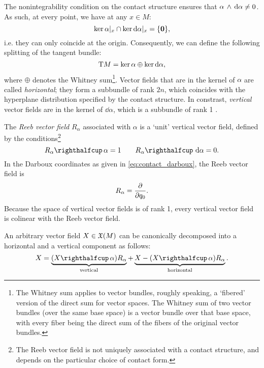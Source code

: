 The nonintegrability condition on the contact structure ensures that \( \alpha\,\wedge\,\dd{\alpha}  \neq 0\). As such, at every point, we have at any \(x\in M\):
\begin{equation}
     \ker{\alpha}\vert_x \cap \ker{\dd{\alpha}}\vert_x = \qty{\mathbf{0}},
\end{equation}
i.e. they can only coincide at the origin. Consequently, we can define the following splitting of the tangent bundle:
\begin{equation}
     \mathrm{T}M = \ker{\alpha}\oplus\ker{\dd{\alpha}},
\end{equation}
where \(\oplus\) denotes the Whitney sum\footnote{The Whitney sum applies to vector bundles, roughly speaking, a `fibered' version of the direct sum for vector spaces. The Whitney sum of two vector bundles (over the same base space) is a vector bundle over that base space, with every fiber being the direct sum of the fibers of the original vector bundles.}. Vector fields that are in the kernel of \(\alpha\) are called \emph{horizontal}; they form a subbundle of rank \(2n\), which coincides with the hyperplane distribution specified by the contact structure. In constrast, \emph{vertical} vector fields are in the kernel of \(\dd{\alpha}\), which is a subbundle of rank 1 \cite{Libermann1987}.

The \emph{Reeb vector field} \(R_\alpha\) associated with \(\alpha\) is a `unit' vertical vector field, defined by the conditions\footnote{The Reeb vector field is not uniquely associated with a contact structure, and depends on the particular choice of contact form.}
    \begin{equation}
     \intpr{R_\alpha}{\alpha} = 1 \qquad \intpr{R_\alpha}{\dd{\alpha}} = 0.
\end{equation}
In the Darboux coordinates as given in \cref{eq:contact_darboux}, the Reeb vector field is
    \begin{equation}
     R_\alpha = \pdv{}{q_0}.
\end{equation} 
Because the space of vertical vector fields is of rank 1, every vertical vector field is colinear with the Reeb vector field.

An arbitrary vector field \(X \in \mathfrak{X}\qty(M)\) can be canonically decomposed into a horizontal and a vertical component as follows:
\begin{equation}
    X = \underbrace{(\intpr{X}{\alpha})R_\alpha}_\text{vertical} + \underbrace{X - (\intpr{X}{\alpha})R_\alpha}_\text{horizontal}.
    \label{eq:vfield_splitting}
\end{equation}

